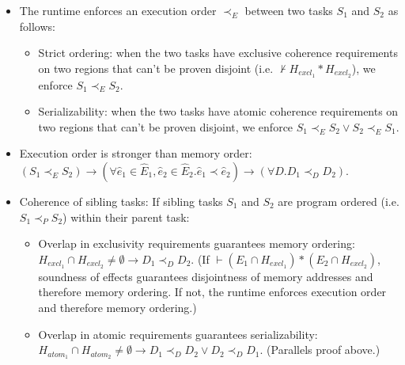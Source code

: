 \begin{itemize}
\item The runtime enforces an execution order $\prec_E$ between two tasks $S_1$ and $S_2$ as follows:

\begin{itemize}

\item Strict ordering: when the two tasks have exclusive coherence requirements on two regions that can't be proven disjoint (i.e. $\not\vdash H_{excl_1} * H_{excl_2}$), we enforce $S_1 \prec_E S_2$.

\item Serializability: when the two tasks have atomic coherence requirements on two regions that can't be proven disjoint, we enforce $S_1 \prec_E S_2 \vee S_2 \prec_E S_1$.

\end{itemize}

\item Execution order is stronger than memory order: $(S_1 \prec_E S_2) \rightarrow ( \forall \hat e_1 \in \hat E_1, \hat e_2 \in \hat E_2 . \hat e_1 \prec \hat e_2 ) \rightarrow (\forall D. D_1 \prec_D D_2)$.

\item Coherence of sibling tasks:  If sibling tasks $S_1$ and $S_2$ are program ordered (i.e. $S_1 \prec_P S_2$) within their parent task:

\begin{itemize}

\item Overlap in exclusivity requirements guarantees memory ordering: $H_{excl_1} \cap H_{excl_2} \neq \emptyset \rightarrow D_1 \prec_D D_2$.  (If $\vdash (E_1 \cap H_{excl_1}) * (E_2 \cap H_{excl_2})$, soundness of effects guarantees disjointness of memory addresses and therefore memory ordering.  If not, the runtime enforces execution order and therefore memory ordering.)

\item Overlap in atomic requirements guarantees serializability: $H_{atom_1} \cap H_{atom_2} \neq \emptyset \rightarrow D_1 \prec_D D_2 \vee D_2 \prec_D D_1$.  (Parallels proof above.)

\end{itemize}

\end{itemize}
